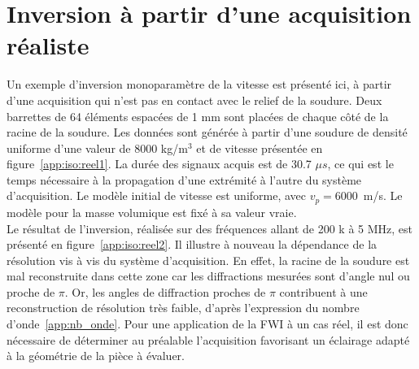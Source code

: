 
\chapter{Inversion à partir d'une acquisition réaliste \label{annexe:acqui}}
Un exemple d'inversion monoparamètre de la vitesse est présenté ici, à partir d'une acquisition qui n'est pas en contact avec le relief de la soudure. Deux barrettes de 64 éléments espacées de 1 mm sont placées de chaque côté de la racine de la soudure. Les données sont générée à partir d'une soudure de densité uniforme d'une valeur de 8000 kg/m$^{3}$ et de vitesse présentée en figure~\ref{app:iso:reel1}. La durée des signaux acquis est de 30.7 $\mu s$, ce qui est le temps nécessaire à la propagation d'une extrémité à l'autre du système d'acquisition. Le modèle initial de vitesse est uniforme, avec $v_{p}=6000$~m/s. Le modèle pour la masse volumique est fixé à sa valeur vraie.\\

 Le résultat de l'inversion, réalisée sur des fréquences allant de 200 k à 5 MHz, est présenté en figure~\ref{app:iso:reel2}. Il illustre à nouveau la dépendance de la résolution vis à vis du système d'acquisition. En effet, la racine de la soudure est mal reconstruite dans cette zone car les diffractions mesurées sont d'angle nul ou proche de $\pi$. Or, les angles de diffraction proches de $\pi$  contribuent à une reconstruction de résolution très faible, d'après l'expression du nombre d'onde~\ref{app:nb_onde}. Pour une application de la FWI à un cas réel, il est donc nécessaire de déterminer au préalable l'acquisition favorisant un éclairage adapté à la géométrie de la pièce à évaluer.
 
